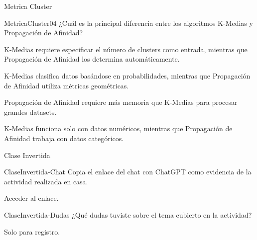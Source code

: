\documentclass[a4,11pt]{aleph-notas}
\begin{document}
\begin{quiz}{Metrica Cluster}
\begin{multi}
    {MetricaCluster04}
    ¿Cuál es la principal diferencia entre los algoritmos K-Medias y Propagación de Afinidad?
    \item* K-Medias requiere especificar el número de clusters como entrada, mientras que Propagación de Afinidad los determina automáticamente.
    \item K-Medias clasifica datos basándose en probabilidades, mientras que Propagación de Afinidad utiliza métricas geométricas.
    \item Propagación de Afinidad requiere más memoria que K-Medias para procesar grandes datasets.
    \item K-Medias funciona solo con datos numéricos, mientras que Propagación de Afinidad trabaja con datos categóricos.
\end{multi}

\end{quiz}


\begin{quiz}{Clase Invertida}
    
\begin{essay}[response format=text, response field lines=5]%
    {ClaseInvertida-Chat}
    Copia el enlace del chat con ChatGPT como evidencia de la actividad realizada en casa.
    \item Acceder al enlace.
\end{essay}

\begin{essay}[response format=text, response field lines=5]%
    {ClaseInvertida-Dudas}
    ¿Qué dudas tuviste sobre el tema cubierto en la actividad?
    \item Solo para registro.
\end{essay}



\end{quiz}
\end{document}
